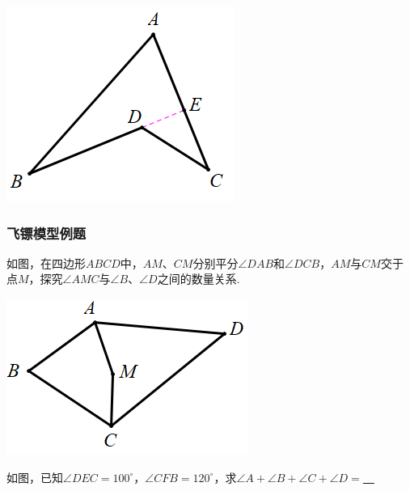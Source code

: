 \documentclass[10pt,twocolumn]{ctexart}
\begin{document}
\begin{minipage}{0.6\textwidth}

\kaishu\color{cyan}{证明：延长$BD$，交$AC$于点$E$，如图.\\
$\because AB+AE>BE, CE+DE>CD\\ 
\therefore AB+AE+CE+DE>BE+CD\\
\therefore AB+AC+DE>BD+DE+CD\\
\therefore AB+AC>BD+CD$}
\end{minipage}
\begin{minipage}{0.4\textwidth}
 \includegraphics[scale=0.5]{figure/feibiao02.PNG}
\end{minipage}

\subsubsection{飞镖模型例题}
\begin{example}
如图，在四边形$ABCD$中，$AM$、$CM$分别平分$\angle DAB$和$\angle DCB$，$AM$与$CM$交于点$M$，探究$\angle AMC$与$\angle B$、$\angle D$之间的数量关系.
\end{example}
 \includegraphics[scale=0.5]{figure/feibiao04.PNG}
 
\begin{example}
如图，已知$\angle DEC=100^\circ$，$\angle CFB=120^\circ$，求$\angle A+\angle B+\angle C+\angle D=$\underline{~\hspace{1cm}~}
\end{example}
\end{document}
